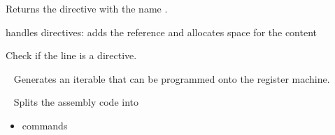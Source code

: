 \documentclass[letterpaper,10pt,english]{sphinxmanual}
\begin{document}
\begin{fulllineitems}
\begin{fulllineitems}
\end{fulllineitems}


\begin{fulllineitems}
\label{tools:py_register_machine2.tools.assembler.assembler.Assembler.getdirective}
Returns the directive with the name .

\end{fulllineitems}


\begin{fulllineitems}
\label{tools:py_register_machine2.tools.assembler.assembler.Assembler.handle_directive}
handles directives: adds the reference and allocates space for the content

\end{fulllineitems}


\begin{fulllineitems}
\label{tools:py_register_machine2.tools.assembler.assembler.Assembler.isdirective}
Check if the line  is a directive.

\end{fulllineitems}


\begin{fulllineitems}
\label{tools:py_register_machine2.tools.assembler.assembler.Assembler.program_run}~\label{tools:program-run}
Generates an iterable that can be programmed onto the register machine.

\end{fulllineitems}


\begin{fulllineitems}
\label{tools:py_register_machine2.tools.assembler.assembler.Assembler.split_run}~\label{tools:split-run}
Splits the assembly code into
\begin{itemize}
\item {} 
commands


\end{itemize}
\end{fulllineitems}
\end{fulllineitems}
\end{document}

